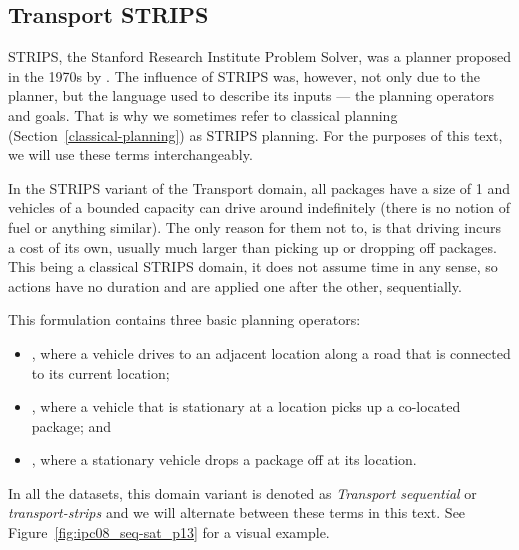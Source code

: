 \subsection{Transport STRIPS}\label{transport-strips}

STRIPS, the Stanford Research Institute Problem Solver,
was a planner proposed in the 1970s by \citet{Fikes1971}.
The influence of STRIPS was, however, not only due to the planner,
but the language used to describe its inputs --- the planning operators and goals.
That is why we sometimes refer to classical planning (Section~\ref{classical-planning})
as STRIPS planning. For the purposes of this text, we will use these terms interchangeably.

In the STRIPS variant of the Transport domain,
all packages have a size of 1 and vehicles of a bounded capacity can drive around indefinitely
(there is no notion of fuel or anything similar). The only reason for them not to, is that
driving incurs a cost of its own, usually much larger than picking up or dropping off packages.
This being a classical STRIPS domain,
it does not assume time in any sense,
so actions have no duration and are applied one after the other, sequentially.

This formulation contains three basic planning operators:

\begin{itemize}
\item \drive{}, where a vehicle drives to an adjacent location
along a road that is connected to its current location;
\item \pickup{}, where a vehicle that is stationary at a location picks up a co-located package; and
\item \drop{}, where a stationary vehicle drops a package off at its location.
\end{itemize}

In all the datasets, this domain variant is denoted as \textit{Transport sequential}
or \textit{transport-strips} and we will alternate between these terms in this text. See Figure~\ref{fig:ipc08_seq-sat_p13} for a visual example.

